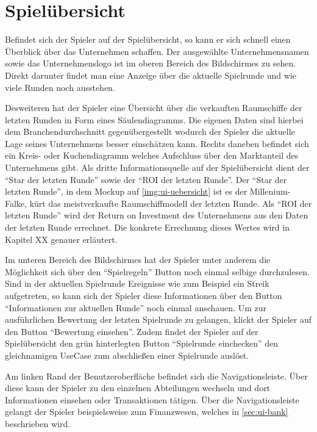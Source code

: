 \section{Spielübersicht}
\label{sec:ui-uebersicht}


Befindet sich der Spieler auf der Spielübersicht, so kann er sich schnell einen Überblick über das Unternehmen schaffen. Der ausgewählte Unternehmensnamen sowie das Unternehmenslogo ist im oberen Bereich des Bildschirmes zu sehen. Direkt darunter findet man eine Anzeige über die aktuelle Spielrunde und wie viele Runden noch ausstehen. 

Desweiteren hat der Spieler eine Übersicht über die verkauften Raumschiffe der letzten Runden in Form eines Säulendiagramms. Die eigenen Daten sind hierbei dem Branchendurchschnitt gegenübergestellt wodurch der Spieler die aktuelle Lage seines Unternehmens besser einschätzen kann. Rechts daneben befindet sich ein Kreis- oder Kuchendiagramm welches Aufschluss über den Marktanteil des Unternehmens gibt. Als dritte Informationsquelle auf der Spielübersicht dient der “Star der letzten Runde” sowie der “ROI der letzten Runde”. Der “Star der letzten Runde”, in dem Mockup auf \vref{img:ui-uebersicht} ist es der Millenium-Falke, kürt das meistverkaufte Raumschiffmodell der letzten Runde. Als “ROI der letzten Runde” wird der Return on Investment des Unternehmens aus den Daten der letzten Runde errechnet. Die konkrete Errechnung dieses Wertes wird in Kapitel XX genauer erläutert.

Im unteren Bereich des Bildschirmes hat der Spieler unter anderem die Möglichkeit sich über den “Spielregeln” Button noch einmal selbige durchzulesen. Sind in der aktuellen Spielrunde Ereignisse wie zum Beispiel ein Streik aufgetreten, so kann sich der Spieler diese Informationen über den Button “Informationen zur aktuellen Runde” noch einmal anschauen. Um zur ausführlichen Bewertung der letzten Spielrunde zu gelangen, klickt der Spieler auf den Button “Bewertung einsehen”. Zudem findet der Spieler auf der Spielübersicht den grün hinterlegten Button “Spielrunde einchecken” den gleichnamigen UseCase zum abschließen einer Spielrunde auslöst. 

Am linken Rand der Benutzeroberfläche befindet sich die Navigationsleiste. Über diese kann der Spieler zu den einzelnen Abteilungen wechseln und dort Informationen einsehen oder Transaktionen tätigen. Über die Navigationsleiste gelangt der Spieler beispielsweise zum Finanzwesen, welches in \ref{sec:ui-bank} beschrieben wird. 

